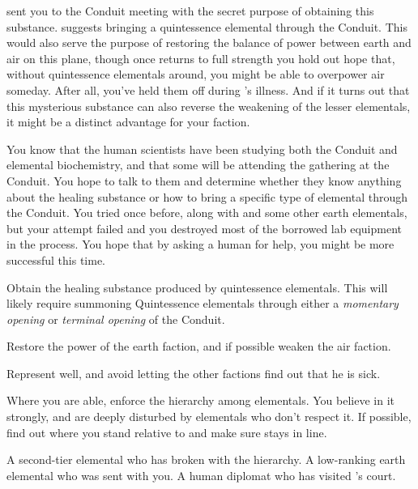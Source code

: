 \documentclass[char]{elementals}
\begin{document}
\cEarthKing{} sent you to the Conduit meeting with the secret purpose of obtaining this substance.  \cEarthKing{\They} suggests bringing a quintessence elemental through the Conduit.  This would also serve the purpose of restoring the balance of power between earth and air on this plane, though once \cEarthKing{} returns to full strength you hold out hope that, without quintessence elementals around, you might be able to overpower air someday.  After all, you've held them off during \cEarthKing{}'s illness.  And if it turns out that this mysterious substance can also reverse the weakening of the lesser elementals, it might be a distinct advantage for your faction.

You know that the human scientists have been studying both the Conduit and elemental biochemistry, and that some will be attending the gathering at the Conduit.  You hope to talk to them and determine whether they know anything about the healing substance or how to bring a specific type of elemental through the Conduit.  You tried once before, along with \cMinion{} and some other earth elementals, but your attempt failed and you destroyed most of the borrowed lab equipment in the  process.  You hope that by asking a human for help, you might be more successful this time.

\begin{itemz}[Goals]
	\item Obtain the healing substance produced by quintessence elementals. This will likely require summoning Quintessence elementals through either a \emph{momentary opening} or \emph{terminal opening} of the Conduit.
	\item Restore the power of the earth faction, and if possible weaken the air faction.
	\item Represent \cEarthKing{} well, and avoid letting the other factions find out that he is sick.
	\item Where you are able, enforce the hierarchy among elementals.  You believe in it strongly, and are deeply disturbed by elementals who don't respect it.  If possible, find out where you stand relative to \cRogue{} and make sure \cMinion{} stays in line.
\end{itemz}
 
\begin{contacts}
	\contact{\cRogue{}}  A second-tier elemental who has broken with the hierarchy.
	\contact{\cMinion{}}  A low-ranking earth elemental who was sent with you.
  \contact{\cAvatar{}}  A human diplomat who has visited \cEarthKing{}'s court.
\end{contacts} 
\end{document}
